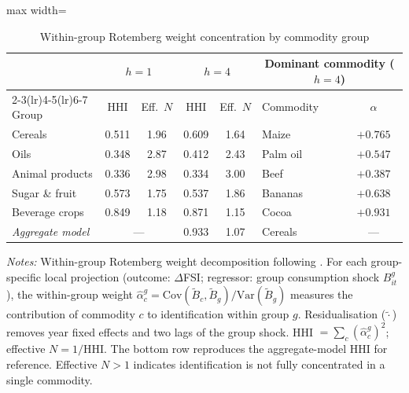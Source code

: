 
\begin{table}[htbp]
\centering
\caption{Within-group Rotemberg weight concentration by commodity group}
\label{tab:rotemberg-within}
\begin{adjustbox}{max width=\textwidth}
\begin{threeparttable}\small
\begin{tabular}{l cc cc lc}
\toprule
 & \multicolumn{2}{c}{$h = 1$} & \multicolumn{2}{c}{$h = 4$} & \multicolumn{2}{c}{Dominant commodity ($h=4$)} \\
\cmidrule(lr){2-3}\cmidrule(lr){4-5}\cmidrule(lr){6-7}
Group & HHI & Eff.\ $N$ & HHI & Eff.\ $N$ & Commodity & $\hat{\alpha}$ \\
\midrule
Cereals & 0.511 & 1.96 & 0.609 & 1.64 & Maize & $+0.765$ \\
Oils & 0.348 & 2.87 & 0.412 & 2.43 & Palm oil & $+0.547$ \\
Animal products & 0.336 & 2.98 & 0.334 & 3.00 & Beef & $+0.387$ \\
Sugar \& fruit & 0.573 & 1.75 & 0.537 & 1.86 & Bananas & $+0.638$ \\
Beverage crops & 0.849 & 1.18 & 0.871 & 1.15 & Cocoa & $+0.931$ \\
\midrule
\textit{Aggregate model} & \multicolumn{2}{c}{---} & 0.933 & 1.07 & Cereals & ---  \\
\bottomrule
\end{tabular}
\begin{tablenotes}\small
\item \textit{Notes:} Within-group Rotemberg weight decomposition following \citet{goldsmith2020bartik}. For each group-specific local projection (outcome: $\Delta$FSI; regressor: group consumption shock $B^g_{it}$), the within-group weight $\hat{\alpha}_c^g = \text{Cov}(\tilde{B}_c, \tilde{B}_g) / \text{Var}(\tilde{B}_g)$ measures the contribution of commodity $c$ to identification within group $g$. Residualisation ($\tilde{\cdot}$) removes year fixed effects and two lags of the group shock. HHI $= \sum_c (\hat{\alpha}_c^g)^2$; effective $N = 1/$HHI. The bottom row reproduces the aggregate-model HHI for reference. Effective $N > 1$ indicates identification is not fully concentrated in a single commodity.
\end{tablenotes}
\end{threeparttable}
\end{adjustbox}
\end{table}
